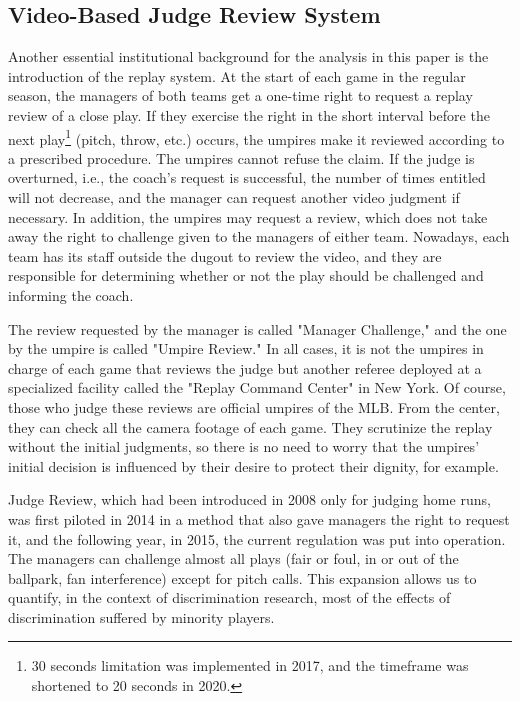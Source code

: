 \documentclass[dvipdfmx, 12pt]{jsarticle}
\begin{document}
\subsection{Video-Based Judge Review System}

Another essential institutional background for the analysis in this paper is the introduction of the replay system. At the start of each game in the regular season, the managers of both teams get a one-time right to request a replay review of a close play. If they exercise the right in the short interval before the next play\footnote{30 seconds limitation was implemented in 2017, and the timeframe was shortened to 20 seconds in 2020.} (pitch, throw, etc.) occurs, the umpires make it reviewed according to a prescribed procedure. The umpires cannot refuse the claim. If the judge is overturned, i.e., the coach's request is successful, the number of times entitled will not decrease, and the manager can request another video judgment if necessary. In addition, the umpires may request a review, which does not take away the right to challenge given to the managers of either team. Nowadays, each team has its staff outside the dugout to review the video, and they are responsible for determining whether or not the play should be challenged and informing the coach.

The review requested by the manager is called  "Manager Challenge," and the one by the umpire is called "Umpire Review." In all cases, it is not the umpires in charge of each game that reviews the judge but another referee deployed at a specialized facility called the "Replay Command Center" in New York. Of course, those who judge these reviews are official umpires of the MLB. From the center, they can check all the camera footage of each game. They scrutinize the replay without the initial judgments, so there is no need to worry that the umpires' initial decision is influenced by their desire to protect their dignity, for example.

Judge Review, which had been introduced in 2008 only for judging home runs, was first piloted in 2014 in a method that also gave managers the right to request it, and the following year, in 2015, the current regulation was put into operation. The managers can challenge almost all plays (fair or foul, in or out of the ballpark, fan interference) except for pitch calls. This expansion allows us to quantify, in the context of discrimination research, most of the effects of discrimination suffered by minority players.
\end{document}
